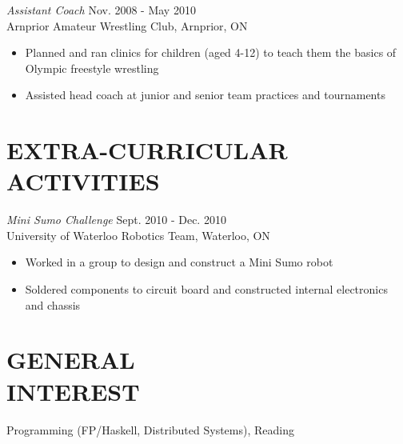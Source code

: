 \documentclass[margin]{res}
\begin{document}
\begin{resume}
{\sl Assistant Coach} \hfill Nov. 2008 - May 2010\\
Arnprior Amateur Wrestling Club, Arnprior, ON
\begin{itemize}\itemsep -2pt
  \item Planned and ran clinics for children (aged 4-12) to teach them the basics of Olympic freestyle wrestling
  \item Assisted head coach at junior and senior team practices and tournaments
\end{itemize}

\section{EXTRA-CURRICULAR \\ ACTIVITIES}
{\it Mini Sumo Challenge}  \hfill Sept. 2010 - Dec. 2010\\
University of Waterloo Robotics Team, Waterloo, ON
\begin{itemize} \itemsep -2pt
  \item Worked in a group to design and construct a Mini Sumo robot
  \item Soldered components to circuit board and constructed internal electronics and chassis
\end{itemize}

\section{GENERAL\\INTEREST}
Programming (FP/Haskell, Distributed Systems), Reading

\end{resume}
\end{document}
